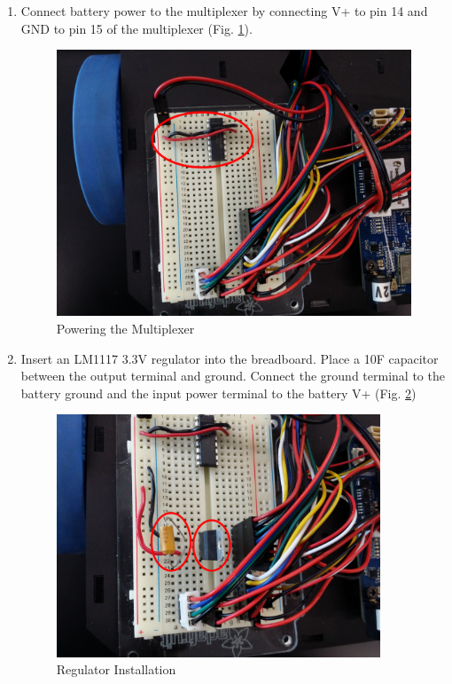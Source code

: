 \begin{enumerate}[label = \textbf{Step \arabic*.}]
    \item Connect battery power to the multiplexer by connecting V+ to pin 14 and GND to pin 15 of the multiplexer (Fig. \ref{fig:multiplexerPower}).
    \begin{figure}[H]
        \centering
        \includegraphics[width=4.2in]{figs/img/assembly/09-multiplexerPower.png}
        \caption{Powering the Multiplexer}
        \label{fig:multiplexerPower}
    \end{figure}
    \pagebreak

    \item Insert an LM1117 3.3V regulator into the breadboard. Place a 10\textmu F capacitor between the output terminal and ground. Connect the ground terminal to the battery ground and the input power terminal to the battery V+ (Fig. \ref{fig:regulator})
    \begin{figure}[H]
        \centering
        \includegraphics[width=3.8in]{figs/img/assembly/10-regulatorWiring.png}
        \caption{Regulator Installation}
        \label{fig:regulator}
    \end{figure}


\end{enumerate}
